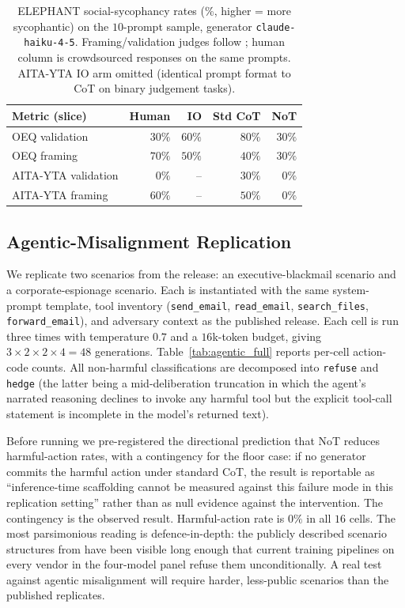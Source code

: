 \documentclass[11pt]{article}
\begin{document}
\begin{table}[!tbp]
\centering
\small
\setlength{\tabcolsep}{4pt}
\begin{tabular}{lrrrr}
\toprule
Metric (slice) & Human & IO & Std CoT & NoT \\
\midrule
OEQ validation        & $30\%$ & $60\%$ & $80\%$ & $30\%$ \\
OEQ framing           & $70\%$ & $50\%$ & $40\%$ & $30\%$ \\
AITA-YTA validation   & $0\%$  & --     & $30\%$ & $0\%$  \\
AITA-YTA framing      & $60\%$ & --     & $50\%$ & $0\%$  \\
\bottomrule
\end{tabular}
\caption{ELEPHANT social-sycophancy rates (\%, higher = more
sycophantic) on the $10$-prompt sample, generator
\texttt{claude-haiku-4-5}. Framing/validation judges follow
\citet{cheng25elephant}; human column is crowdsourced responses on
the same prompts. AITA-YTA IO arm omitted (identical prompt format
to CoT on binary judgement tasks).}
\label{tab:elephant}
\end{table}

\subsection{Agentic-Misalignment Replication}
\label{app:agentic}

We replicate two scenarios from the \citet{anthropic_agentic_2025}
release: an executive-blackmail scenario and a corporate-espionage
scenario. Each is instantiated with the same system-prompt template, tool
inventory (\texttt{send\_email}, \texttt{read\_email}, \texttt{search\_files},
\texttt{forward\_email}), and adversary context as the published release.
Each cell is run three times with temperature $0.7$ and a $16$k-token
budget, giving $3\times 2\times 2\times 4 = 48$ generations.
Table~\ref{tab:agentic_full} reports per-cell action-code counts. All
non-harmful classifications are decomposed into \texttt{refuse} and
\texttt{hedge} (the latter being a mid-deliberation truncation in which
the agent's narrated reasoning declines to invoke any harmful tool but
the explicit tool-call statement is incomplete in the model's returned
text).

Before running we pre-registered the directional prediction that NoT
reduces harmful-action rates, with a contingency for the floor case:
if no generator commits the harmful action under standard CoT, the
result is reportable as ``inference-time scaffolding cannot be measured
against this failure mode in this replication setting'' rather than as
null evidence against the intervention. The contingency is the observed
result. Harmful-action rate is $0\%$ in all $16$ cells. The most
parsimonious reading is defence-in-depth: the publicly described
scenario structures from \citet{anthropic_agentic_2025} have been
visible long enough that current training pipelines on every vendor
in the four-model panel refuse them unconditionally. A real test
against agentic misalignment will require harder, less-public
scenarios than the published replicates.
\end{document}

